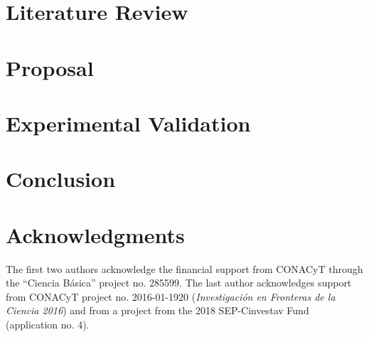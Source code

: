 \documentclass[journal]{IEEEtran}
\begin{document}
\section{Literature Review}
\label{Sec:LiteratureReview}


\section{Proposal}
\label{Sec:Proposal}



\section{Experimental Validation}
\label{Sec:ExperimentalValidation}


\section{Conclusion}
\label{Sec:Conclusion}


%


\section*{Acknowledgments}
The first two authors acknowledge the financial support from CONACyT through the ``Ciencia B\'asica'' project no. 285599.
The last author acknowledges support from CONACyT
project no. 2016-01-1920 ({\em Investigaci\'{o}n en Fronteras de la Ciencia 2016})
and from a project from the 2018 SEP-Cinvestav Fund (application no. 4).


\ifCLASSOPTIONcaptionsoff
  \newpage
\fi



\end{document}

